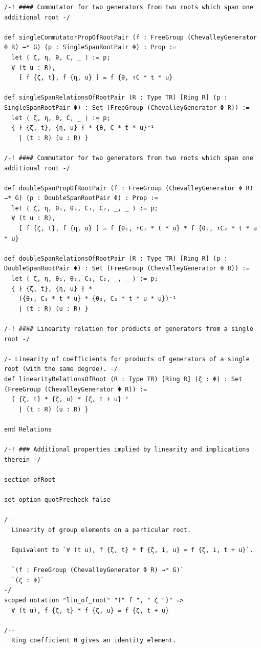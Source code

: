 \documentclass[10pt,a4paper]{article}
\begin{document}
\begin{Verbatim}
/-! #### Commutator for two generators from two roots which span one additional root -/

def singleCommutatorPropOfRootPair (f : FreeGroup (ChevalleyGenerator Φ R) →* G) (p : SingleSpanRootPair Φ) : Prop :=
  let ⟨ ζ, η, θ, C, _ ⟩ := p;
  ∀ (t u : R),
    ⁅ f {ζ, t}, f {η, u} ⁆ = f {θ, ↑C * t * u}

def singleSpanRelationsOfRootPair (R : Type TR) [Ring R] (p : SingleSpanRootPair Φ) : Set (FreeGroup (ChevalleyGenerator Φ R)) :=
  let ⟨ ζ, η, θ, C, _ ⟩ := p;
  { ⁅ {ζ, t}, {η, u} ⁆ * {θ, C * t * u}⁻¹
    | (t : R) (u : R) }

/-! #### Commutator for two generators from two roots which span one additional root -/

def doubleSpanPropOfRootPair (f : FreeGroup (ChevalleyGenerator Φ R) →* G) (p : DoubleSpanRootPair Φ) : Prop :=
  let ⟨ ζ, η, θ₁, θ₂, C₁, C₂, _, _ ⟩ := p;
  ∀ (t u : R),
    ⁅ f {ζ, t}, f {η, u} ⁆ = f {θ₁, ↑C₁ * t * u} * f {θ₂, ↑C₂ * t * u * u}

def doubleSpanRelationsOfRootPair (R : Type TR) [Ring R] (p : DoubleSpanRootPair Φ) : Set (FreeGroup (ChevalleyGenerator Φ R)) :=
  let ⟨ ζ, η, θ₁, θ₂, C₁, C₂, _, _ ⟩ := p;
  { ⁅ {ζ, t}, {η, u} ⁆ *
    ({θ₁, C₁ * t * u} * {θ₂, C₂ * t * u * u})⁻¹
    | (t : R) (u : R) }

/-! #### Linearity relation for products of generators from a single root -/

/- Linearity of coefficients for products of generators of a single root (with the same degree). -/
def linearityRelationsOfRoot (R : Type TR) [Ring R] (ζ : Φ) : Set (FreeGroup (ChevalleyGenerator Φ R)) :=
  { {ζ, t} * {ζ, u} * {ζ, t + u}⁻¹
    | (t : R) (u : R) }

end Relations

/-! ### Additional properties implied by linearity and implications therein -/

section ofRoot

set_option quotPrecheck false

/--
  Linearity of group elements on a particular root.

  Equivalent to `∀ (t u), f {ζ, t} * f {ζ, i, u} = f {ζ, i, t + u}`.

  `(f : FreeGroup (ChevalleyGenerator Φ R) →* G)`
  `(ζ : Φ)`
-/
scoped notation "lin_of_root" "(" f ", " ζ ")" =>
  ∀ (t u), f {ζ, t} * f {ζ, u} = f {ζ, t + u}

/--
  Ring coefficient 0 gives an identity element.


\end{Verbatim}
\end{document}
